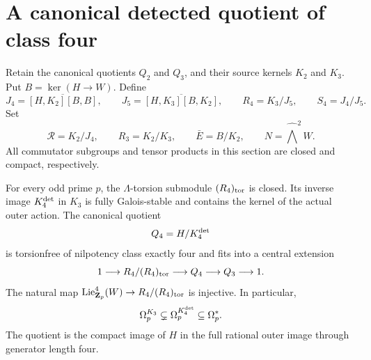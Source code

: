 \section{A canonical detected quotient of class four}
\label{sec:canonical-class-four}

Retain the canonical quotients $Q_2$ and $Q_3$, and their
source kernels $K_2$ and $K_3$. Put $B=\ker(H\to W)$.
Define
\[
 J_4=\overline{[H,K_2][B,B]},\qquad
 J_5=\overline{[H,K_3][B,K_2]},\qquad
 R_4=K_3/J_5,\qquad S_4=J_4/J_5.
\]
Set
\[
 \mathcal R=K_2/J_4,\qquad R_3=K_2/K_3,\qquad
 \bar E=B/K_2,\qquad N=\widehat\bigwedge^2W.
\]
All commutator subgroups and tensor products in this
section are closed and compact, respectively.



\begin{theorem}\label{thm:canonical-class-four}
For every odd prime $p$, the $\Lambda$-torsion submodule
$(R_4)_{\rm tor}$ is closed. Its inverse image
$K_4^{\rm det}$ in $K_3$ is fully Galois-stable and
contains the kernel of the actual outer action. The
canonical quotient
\[
                         Q_4=H/K_4^{\rm det}
\]
is torsionfree of nilpotency class exactly four and
fits into a central extension
\[
 1\longrightarrow R_4/(R_4)_{\rm tor}
 \longrightarrow Q_4\longrightarrow Q_3\longrightarrow1.
\]
The natural map $\operatorname{Lie}^4_{\mathbf Z_p}(W)
\to R_4/(R_4)_{\rm tor}$ is injective. In particular,
\[
 \Omega_p^{K_3}\subsetneq\Omega_p^{K_4^{\rm det}}
                              \subseteq\Omega_p^*.
\]
The quotient is the compact image of $H$ in the full
rational outer image through generator length four.
\end{theorem}

